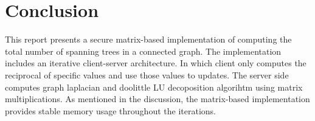 \documentclass{winslabreport}
\begin{document}
\section{Conclusion}
This report presents a secure matrix-based implementation of computing the total number of spanning trees in a connected graph. The implementation includes an iterative client-server architecture. In which client only computes the reciprocal of specific values and use those values to updates. The server side computes graph laplacian and doolittle LU decoposition algorihtm using matrix multiplications. As mentioned in the discussion, the matrix-based implementation provides stable memory usage throughout the iterations.  



\end{document}
